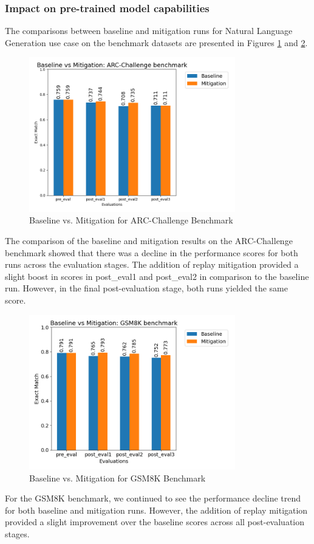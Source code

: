 \subsubsection{Impact on pre-trained model capabilities}
The comparisons between baseline and mitigation runs for Natural Language Generation use case on the benchmark datasets are presented in Figures \ref{fig:ArcComparison} and \ref{fig:GSM8kComparison}. 
\begin{figure}[H]
    \centering
    \includegraphics[width=0.8\textwidth]{Figures/results/trace_comparisons/arc_challenge/comparison_arc_challenge.png} 
    \caption{Baseline vs. Mitigation for ARC-Challenge Benchmark}
    \label{fig:ArcComparison}
\end{figure}
The comparison of the baseline and mitigation results on the ARC-Challenge benchmark showed that there was a decline in the performance scores for both runs across the evaluation stages. The addition of replay mitigation provided a slight boost in scores in post\_eval1 and post\_eval2 in comparison to the baseline run. However, in the final post-evaluation stage, both runs yielded the same score.

\begin{figure}[H]
    \centering
    \includegraphics[width=0.8\textwidth]{Figures/results/trace_comparisons/gsm8k/comparison_gsm8k.png} 
    \caption{Baseline vs. Mitigation for GSM8K Benchmark}
    \label{fig:GSM8kComparison}
\end{figure}
For the GSM8K benchmark, we continued to see the performance decline trend for both baseline and mitigation runs. However, the addition of replay mitigation provided a slight improvement over the baseline scores across all post-evaluation stages.

